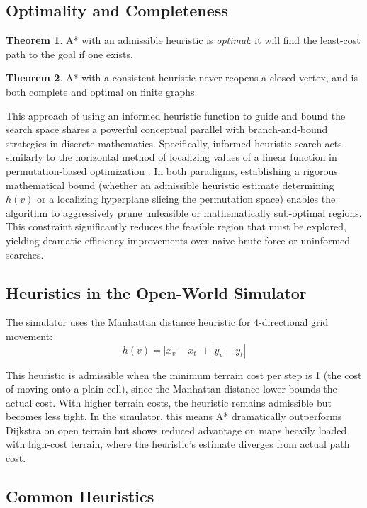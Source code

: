 \documentclass[12pt, a4paper, oneside]{report}
\theoremstyle{definition}
\newtheorem{theorem}{Theorem}[chapter]
\begin{document}
\subsection{Optimality and Completeness}

\begin{theorem}
A* with an admissible heuristic is \emph{optimal}: it will find the least-cost path to the goal if one exists.
\end{theorem}

\begin{theorem}
A* with a consistent heuristic never reopens a closed vertex, and is both complete and optimal on finite graphs.
\end{theorem}

This approach of using an informed heuristic function to guide and bound the search space shares a powerful conceptual parallel with branch-and-bound strategies in discrete mathematics. Specifically, informed heuristic search acts similarly to the horizontal method of localizing values of a linear function in permutation-based optimization \citep{koliechkina2020}. In both paradigms, establishing a rigorous mathematical bound (whether an admissible heuristic estimate determining $h(v)$ or a localizing hyperplane slicing the permutation space) enables the algorithm to aggressively prune unfeasible or mathematically sub-optimal regions. This constraint significantly reduces the feasible region that must be explored, yielding dramatic efficiency improvements over naive brute-force or uninformed searches.

\subsection{Heuristics in the Open-World Simulator}

The simulator uses the Manhattan distance heuristic for 4-directional grid movement:
\[
h(v) = |x_v - x_t| + |y_v - y_t|
\]

This heuristic is admissible when the minimum terrain cost per step is 1 (the cost of moving onto a plain cell), since the Manhattan distance lower-bounds the actual cost. With higher terrain costs, the heuristic remains admissible but becomes less tight. In the simulator, this means A* dramatically outperforms Dijkstra on open terrain but shows reduced advantage on maps heavily loaded with high-cost terrain, where the heuristic's estimate diverges from actual path cost.

\subsection{Common Heuristics}
\end{document}
